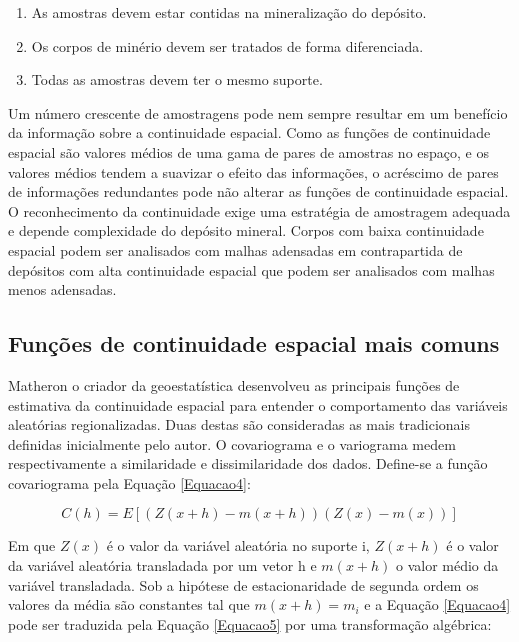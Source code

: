 \begin{enumerate}
	\item As amostras devem estar contidas na mineralização do depósito.
	\item Os corpos de minério devem ser tratados de forma diferenciada.
	\item Todas as amostras devem ter o mesmo suporte.	
\end{enumerate}

Um número crescente de amostragens pode nem sempre resultar em um benefício da informação sobre a continuidade espacial. Como as funções de continuidade espacial são valores médios de uma gama de pares de amostras no espaço, e os valores médios tendem a suavizar o efeito das informações, o acréscimo de pares de informações redundantes pode não alterar as funções de continuidade espacial. O reconhecimento da continuidade exige uma estratégia de amostragem adequada e depende complexidade do depósito mineral. Corpos com baixa continuidade espacial podem ser analisados com malhas adensadas em contrapartida de depósitos com alta continuidade espacial que podem ser analisados com malhas menos adensadas. 

\subsection{Funções de continuidade espacial mais comuns}

Matheron o criador da geoestatística desenvolveu as principais funções de estimativa da continuidade espacial para entender o comportamento das variáveis aleatórias regionalizadas. Duas destas são consideradas as mais tradicionais definidas inicialmente pelo autor. O covariograma e o variograma medem respectivamente a similaridade e dissimilaridade dos dados. Define-se a função covariograma pela Equação \ref{Equacao4}:

\begin{equation}\label{Equacao4}
C(h) = E\left[ \left( Z(x+h) - m(x+h) \right) \left( Z(x) -m(x)\right) \right] 
\end{equation}

Em que $Z(x)$ é o valor da variável aleatória no suporte i, $Z(x+h)$ é o valor da variável aleatória transladada por um vetor h e $m(x+h)$ o valor médio da variável transladada. Sob a hipótese de estacionaridade de segunda ordem os valores da média são constantes tal que $m(x+h)=m_i$ e a Equação \ref{Equacao4}  pode ser traduzida pela Equação \ref{Equacao5} por uma transformação algébrica: 

